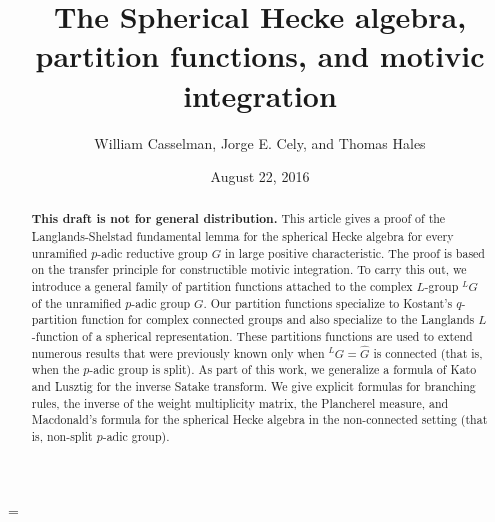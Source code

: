 \documentclass{amsart}
\theoremstyle{plain}
\theoremstyle{definition}
\theoremstyle{remark}
\numberwithin{equation}{subsection}
\begin{document}
\title
    {The Spherical Hecke algebra, partition functions, and motivic integration}
\author{William Casselman, Jorge E. Cely, and Thomas Hales}
\date{August 22, 2016}


\begin{abstract}  
{\bf This draft is not for general distribution.}   
This article gives a proof of the Langlands-Shelstad fundamental lemma for the spherical Hecke algebra
for every unramified $p$-adic reductive group $G$ in large positive characteristic.  The proof is based on the transfer principle
for constructible motivic integration.    To carry this out,
we introduce a general family of partition functions attached to 
the complex $L$-group ${}^LG$ of the unramified $p$-adic group $G$.
Our partition functions specialize to Kostant's $q$-partition function for complex connected groups and also 
specialize to the Langlands $L$-function of a spherical representation.
These partitions functions are used to extend numerous results that were previously known only when ${}^LG=\hat G$ is
connected (that is, when the $p$-adic group is split).
As part of this work, we generalize a formula of Kato and Lusztig for the inverse Satake transform.
We give explicit formulas for branching rules, the inverse of the weight multiplicity matrix,
the Plancherel measure,  and Macdonald's formula for the spherical Hecke algebra in
the non-connected setting (that is, non-split $p$-adic group).  
% 
\end{abstract}


\parskip=\baselineskip

 \maketitle



    

      
      
       
      
      
\end{document}
